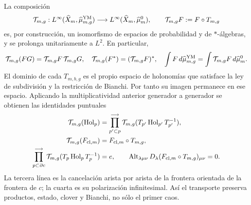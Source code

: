 La composición
\begin{equation}\label{eq:pdf2-ym-full-probability-isomorphism}
 \mathcal T_{m,g}:L^\infty(\widehat X_m,\widehat\mu_{m,g}^{\rm YM})
 \longrightarrow L^\infty(\widehat X_m,\widehat\mu_m^0),
 \qquad \mathcal T_{m,g}F:=F\circ T_{m,g}
\end{equation}
es, por construcción, un isomorfismo de espacios de probabilidad y de
$*$-álgebras, y se prolonga unitariamente a $L^2$. En particular,
\begin{equation}\label{eq:pdf2-ym-full-algebra-identities}
 \mathcal T_{m,g}(FG)=\mathcal T_{m,g}F\,\mathcal T_{m,g}G,
 \quad
 \mathcal T_{m,g}(F^*)=(\mathcal T_{m,g}F)^*,
 \quad
 \int F\,d\widehat\mu_{m,g}^{\rm YM}
 =\int\mathcal T_{m,g}F\,d\widehat\mu_m^0.
\end{equation}
El dominio de cada $T_{m,b,g}$ es el propio espacio de holonomías que satisface
la ley de subdivisión y la restricción de Bianchi. Por tanto su imagen permanece
en ese espacio. Aplicando la multiplicatividad anterior generador a generador se
obtienen las identidades puntuales
\begin{equation}\label{eq:pdf2-ym-transport-surface-bianchi}
 \begin{aligned}
 \mathcal T_{m,g}(\operatorname{Hol}_p)
 &=\prod_{p'\subset p}^{\longrightarrow}
   \mathcal T_{m,g}(T_{p'}\operatorname{Hol}_{p'}T_{p'}^{-1}),\\
 \mathcal T_{m,g}(F_{{\rm cl},m})
 &=F_{{\rm cl},m}\circ T_{m,g},\\
 \prod_{p\subset\partial c}^{\longrightarrow}
 \mathcal T_{m,g}(T_p\operatorname{Hol}_pT_p^{-1})&=e,
 \qquad
 \operatorname{Alt}_{\lambda\mu\nu}
 D_\lambda(F_{{\rm cl},m}\circ T_{m,g})_{\mu\nu}=0.
 \end{aligned}
\end{equation}
La tercera línea es la cancelación arista por arista de la frontera orientada de
la frontera de $c$; la cuarta es su polarización infinitesimal. Así el transporte
preserva productos, estado, clover y Bianchi, no sólo el primer caos.


